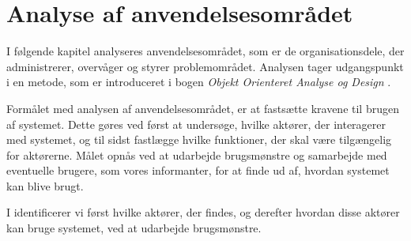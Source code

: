 \chapter{Analyse af anvendelsesområdet}
\label{chap:analyseafao}

I følgende kapitel analyseres anvendelsesområdet, som er de organisationsdele, der administrerer, overvåger og styrer problemområdet. Analysen tager udgangspunkt i en metode, som er introduceret i bogen \emph{Objekt Orienteret Analyse og Design} \cite[p. ~113]{ooad}. 

Formålet med analysen af anvendelsesområdet, er at fastsætte kravene til brugen af systemet. Dette gøres ved først at undersøge, hvilke aktører, der interagerer med systemet, og til sidst fastlægge hvilke funktioner, der skal være tilgængelig for aktørerne. Målet opnås ved at udarbejde brugsmønstre og samarbejde med eventuelle brugere, som vores informanter, for at finde ud af, hvordan systemet kan blive brugt.

I  identificerer vi først hvilke aktører, der findes, og derefter hvordan disse aktører kan bruge systemet, ved at udarbejde brugsmønstre.




